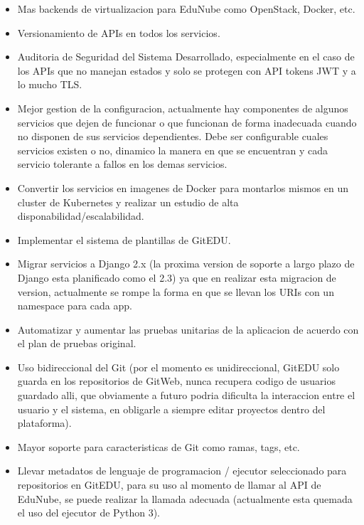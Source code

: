\begin{itemize}
    \item Mas backends de virtualizacion para EduNube como OpenStack, Docker, etc.
    \item Versionamiento de APIs en todos los servicios.
    \item Auditoria de Seguridad del Sistema Desarrollado, especialmente en el caso de los APIs que no manejan estados y solo se protegen con API tokens JWT y a lo mucho TLS.
    \item Mejor gestion de la configuracion, actualmente hay componentes de algunos servicios que dejen de funcionar o que funcionan de forma inadecuada cuando no disponen de sus servicios dependientes. Debe ser configurable cuales servicios existen o no, dinamico la manera en que se encuentran y cada servicio tolerante a fallos en los demas servicios.
    \item Convertir los servicios en imagenes de Docker para montarlos mismos en un cluster de Kubernetes y realizar un estudio de alta disponabilidad/escalabilidad.
    \item Implementar el sistema de plantillas de GitEDU.
    \item Migrar servicios a Django 2.x (la proxima version de soporte a largo plazo de Django esta planificado como el 2.3) ya que en realizar esta migracion de version, actualmente se rompe la forma en que se llevan los URIs con un namespace para cada app.
    \item Automatizar y aumentar las pruebas unitarias de la aplicacion de acuerdo con el plan de pruebas original.
    \item Uso bidireccional del Git (por el momento es unidireccional, GitEDU solo guarda en los repositorios de GitWeb, nunca recupera codigo de usuarios guardado alli, que obviamente a futuro podria dificulta la interaccion entre el usuario y el sistema, en obligarle a siempre editar proyectos dentro del plataforma).
    \item Mayor soporte para caracteristicas de Git como ramas, tags, etc.
    \item Llevar metadatos de lenguaje de programacion / ejecutor seleccionado para repositorios en GitEDU, para su uso al momento de llamar al API de EduNube, se puede realizar la llamada adecuada (actualmente esta quemada el uso del ejecutor de Python 3).
\end{itemize}
